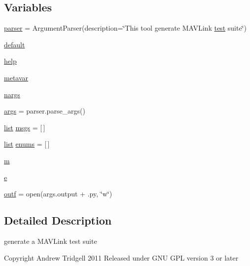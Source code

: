 \subsection*{Variables}
\begin{DoxyCompactItemize}
\item 
\mbox{\hyperlink{namespacepymavlink_1_1generator_1_1mavtestgen_ab620e2ff96a457c9698e3708c7316838}{parser}} = Argument\+Parser(description=\char`\"{}This tool generate M\+A\+V\+Link \mbox{\hyperlink{classtest}{test}} suite\char`\"{})
\item 
\mbox{\hyperlink{namespacepymavlink_1_1generator_1_1mavtestgen_ab45eb25c7f20d761a4469d739be313ce}{default}}
\item 
\mbox{\hyperlink{namespacepymavlink_1_1generator_1_1mavtestgen_a226f47485edb2f3f791d5167a2629b40}{help}}
\item 
\mbox{\hyperlink{namespacepymavlink_1_1generator_1_1mavtestgen_a91aed16f2cce928c890e7723fdfca8bc}{metavar}}
\item 
\mbox{\hyperlink{namespacepymavlink_1_1generator_1_1mavtestgen_ab3c4c9ffb18228eea8f7518c2228cc70}{nargs}}
\item 
\mbox{\hyperlink{namespacepymavlink_1_1generator_1_1mavtestgen_a223b963924b8f6511f130738e636ae5a}{args}} = parser.\+parse\+\_\+args()
\item 
\mbox{\hyperlink{structlist}{list}} \mbox{\hyperlink{namespacepymavlink_1_1generator_1_1mavtestgen_a57c1b5445619b3fe490684298c5c36c6}{msgs}} = \mbox{[}$\,$\mbox{]}
\item 
\mbox{\hyperlink{structlist}{list}} \mbox{\hyperlink{namespacepymavlink_1_1generator_1_1mavtestgen_a53aa39d8783bf0f9d981719593561c9e}{enums}} = \mbox{[}$\,$\mbox{]}
\item 
\mbox{\hyperlink{namespacepymavlink_1_1generator_1_1mavtestgen_a107cb672cec756bd43d417aadf4e1892}{m}}
\item 
\mbox{\hyperlink{namespacepymavlink_1_1generator_1_1mavtestgen_a836e99b235ff4bcfe1d25538a4a0841c}{e}}
\item 
\mbox{\hyperlink{namespacepymavlink_1_1generator_1_1mavtestgen_a62d1fc41625a9ec5e92023a59bf698bf}{outf}} = open(args.\+output + \textquotesingle{}.py\textquotesingle{}, \char`\"{}w\char`\"{})
\end{DoxyCompactItemize}


\subsection{Detailed Description}
\begin{DoxyVerb}generate a MAVLink test suite

Copyright Andrew Tridgell 2011
Released under GNU GPL version 3 or later
\end{DoxyVerb}
 


